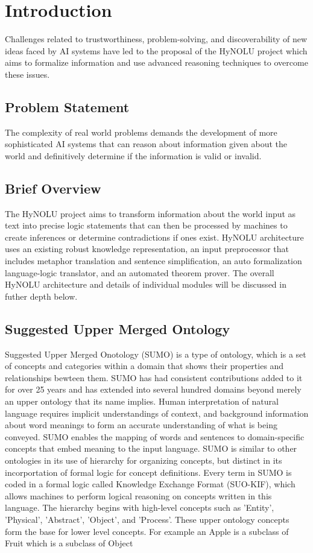 

\chapter{Introduction}\label{ch:common}

Challenges related to trustworthiness, problem-solving, and discoverability of new ideas faced by AI systems have led to the proposal of the HyNOLU project which aims to formalize information and use advanced reasoning techniques to overcome these issues.

\section{Problem Statement}
The complexity of real world problems demands the development of more sophisticated AI systems
that can reason about information given about the world and definitively determine if the information is valid or invalid.

\section{Brief Overview}
The HyNOLU project aims to transform information about the world input as text into precise logic statements that can then be processed by machines to create inferences or determine contradictions if ones exist. HyNOLU architecture uses an existing robust knowledge representation, an input preprocessor that includes metaphor translation and sentence simplification, an auto formalization language-logic translator, and an automated theorem prover. The overall HyNOLU architecture and details of individual modules will be discussed in futher depth below.

\section{Suggested Upper Merged Ontology}
Suggested Upper Merged Onotology (SUMO) is a type of ontology, which is a set of concepts and categories within a domain that shows their properties and relationships bewteen them. SUMO has had consistent contributions added to it for over 25 years and has extended into several hundred domains beyond merely an upper ontology that its name implies. Human interpretation of natural language requires implicit understandings of context, and background information about word meanings to form an accurate understanding of what is being conveyed. SUMO enables the mapping of words and sentences to domain-specific concepts that embed meaning to the input language. SUMO is similar to other ontologies in its use of hierarchy for organizing concepts, but distinct in its incorportation of formal logic for concept definitions. Every term in SUMO is coded in a formal logic called Knowledge Exchange Format (SUO-KIF), which allows machines to perform logical reasoning on concepts written in this language. The hierarchy begins with high-level concepts such as 'Entity', 'Physical', 'Abstract', 'Object', and 'Process'. These upper ontology concepts form the base for lower level concepts. For example an Apple is a subclass of Fruit which is a subclass of Object


